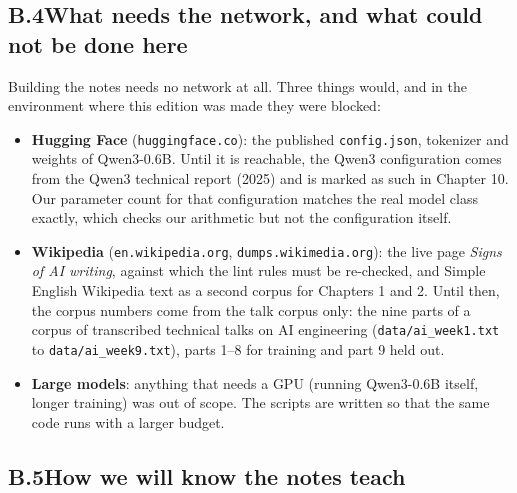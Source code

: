 \subsection*{B.4\quad What needs the network, and what could not be done here}

Building the notes needs no network at all. Three things would, and in the environment where this
edition was made they were blocked:
\begin{itemize}
\item \textbf{Hugging Face} (\texttt{huggingface.co}): the published \texttt{config.json}, tokenizer and
weights of Qwen3-0.6B. Until it is reachable, the Qwen3 configuration comes from the Qwen3 technical report
(2025) and is marked as such in Chapter 10. Our parameter count for that configuration matches the real
model class exactly, which checks our arithmetic but not the configuration itself.
\item \textbf{Wikipedia} (\texttt{en.wikipedia.org}, \texttt{dumps.wikimedia.org}): the live page
\emph{Signs of AI writing}, against which the lint rules must be re-checked, and Simple English Wikipedia
text as a second corpus for Chapters 1 and 2. Until then, the corpus numbers come from the talk corpus
only: the nine parts of a corpus of transcribed technical talks on AI engineering
(\texttt{data/ai\_week1.txt} to \texttt{data/ai\_week9.txt}), parts 1--8 for training and part 9 held out.
\item \textbf{Large models}: anything that needs a GPU (running Qwen3-0.6B itself, longer training) was
out of scope. The scripts are written so that the same code runs with a larger budget.
\end{itemize}

\subsection*{B.5\quad How we will know the notes teach}

